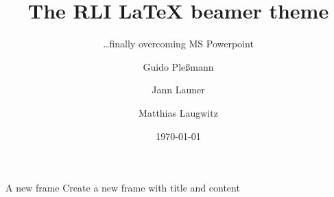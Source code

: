 \documentclass[ignorenonframetext,aspectratio=169]{beamer}
\title{The RLI \LaTeX{} beamer theme}
\subtitle{\ldots finally overcoming MS Powerpoint}
\author{Guido Pleßmann \and Jann Launer \and Matthias Laugwitz}
\date{\today}
\institute{Reiner Lemoine Institut}
\begin{document}
\frame{\titlepage}

\begin{frame}[fragile]{A new frame}
Create a new frame with title and content
\end{frame}












\end{document}
